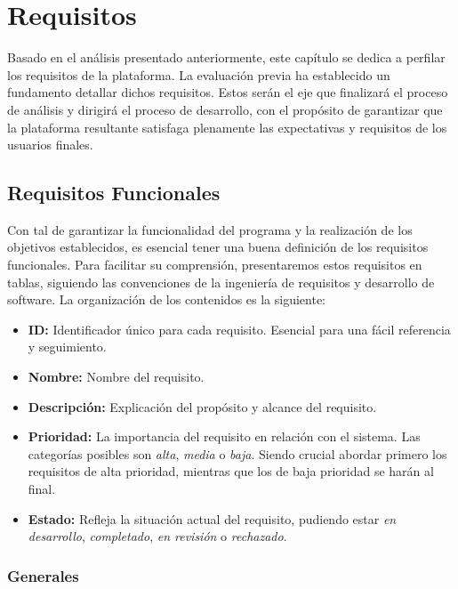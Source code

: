 \chapter{Requisitos} \label{chap:requisitos}

Basado en el análisis presentado anteriormente, este capítulo se dedica a perfilar los requisitos de la plataforma. La evaluación previa ha establecido un fundamento detallar dichos requisitos. Estos serán el eje que finalizará el proceso de análisis y dirigirá el proceso de desarrollo, con el propósito de garantizar que la plataforma resultante satisfaga plenamente las expectativas y requisitos de los usuarios finales.

\section{Requisitos Funcionales}

Con tal de garantizar la funcionalidad del programa y la realización de los objetivos establecidos, es esencial tener una buena definición de los requisitos funcionales. Para facilitar su comprensión, presentaremos estos requisitos en tablas, siguiendo las convenciones de la ingeniería de requisitos y desarrollo de software. La organización de los contenidos es la siguiente:

\begin{itemize}
    \item \textbf{ID:} Identificador único para cada requisito. Esencial para una fácil referencia y seguimiento.
    \item \textbf{Nombre:} Nombre del requisito.
    \item \textbf{Descripción:} Explicación del propósito y alcance del requisito.
    \item \textbf{Prioridad:} La importancia del requisito en relación con el sistema. Las categorías posibles son \textit{alta}, \textit{media} o \textit{baja}. Siendo crucial abordar primero los requisitos de alta prioridad, mientras que los de baja prioridad se harán al final.
    \item \textbf{Estado:} Refleja la situación actual del requisito, pudiendo estar \textit{en desarrollo}, \textit{completado}, \textit{en revisión} o \textit{rechazado}.
\end{itemize}


\subsection{Generales}

